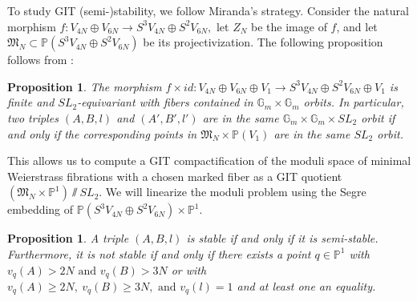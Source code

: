 \documentclass[11pt]{amsart}
\newtheorem{prop}[theorem]{Proposition}
\theoremstyle{definition}
\theoremstyle{remark}
\newcommand{\mb}[1]{\mathbb{#1}}
\begin{document}
	To study GIT (semi-)stability, we follow Miranda's strategy. Consider the natural morphism 
	$
	f: V_{4N} \oplus V_{6N} \to S^3V_{4N} \oplus S^2V_{6N},
	$
	let $Z_N$ be the image of $f$, and let $\mathfrak{M}_N \subset \mb{P}(S^3V_{4N} \oplus S^2V_{6N})$ be  its projectivization.  The following proposition follows from \cite[Propositions 3.1 \& 3.2]{mir}:
	
	\begin{prop} The morphism 
		$
		f \times id : V_{4N} \oplus V_{6N} \oplus V_1 \to S^3V_{4N} \oplus S^2V_{6N} \oplus V_1
		$
		is finite and $SL_2$-equivariant with fibers contained in $\mathbb{G}_m \times \mathbb{G}_m$ orbits. In particular, two triples $(A,B,l)$ and $(A',B',l')$ are in the same $\mathbb{G}_m \times \mathbb{G}_m \times SL_2$ orbit if and only if the corresponding points in $\mathfrak{M}_N \times \mb{P}(V_1)$ are in the same $SL_2$ orbit. 
	\end{prop}
	
	This allows us to compute a GIT compactification of the moduli space of minimal Weierstrass fibrations with a chosen marked fiber as a GIT quotient $(\mathfrak{M}_N \times \mb{P}^1) \sslash SL_2$. We will linearize the moduli problem using the Segre embedding of $\mb{P}(S^3V_{4N} \oplus S^2V_{6N}) \times \mb{P}^1$. 
	
	\begin{prop}\label{prop:git} A triple $(A,B,l)$ is stable if and only if it is semi-stable. Furthermore, it is not stable if and only if there exists a point $q \in \mb{P}^1$ with 
		$
		v_q(A) > 2N \text{ and } v_q(B) > 3N
		$
		or with 
		$
		v_q(A) \geq 2N, \ v_q(B) \geq 3N, \text{ and } v_q(l) = 1
		$
		and at least one an equality. 
	\end{prop} 
	
\end{document}
